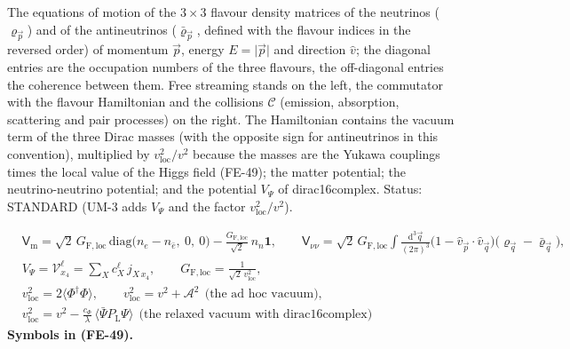 \documentclass[
  10pt,
]{article}
\begin{document}
The equations of motion of the \(3 \times 3\) flavour density matrices
of the neutrinos (\(\varrho_{\vec p}\)) and of the antineutrinos
(\(\bar\varrho_{\vec p}\), defined with the flavour indices in the
reversed order) of momentum \(\vec p\), energy
\(E = \lvert\vec p\rvert\) and direction \(\hat v\); the diagonal
entries are the occupation numbers of the three flavours, the
off-diagonal entries the coherence between them. Free streaming stands
on the left, the commutator with the flavour Hamiltonian and the
collisions \(\mathcal{C}\) (emission, absorption, scattering and pair
processes) on the right. The Hamiltonian contains the vacuum term of the
three Dirac masses (with the opposite sign for antineutrinos in this
convention), multiplied by \(v_{\mathrm{loc}}^2/v^2\) because the masses
are the Yukawa couplings times the local value of the Higgs field
(FE-49); the matter potential; the neutrino-neutrino potential; and the
potential \(V_\Psi\) of dirac16complex. Status: STANDARD (UM-3 adds
\(V_\Psi\) and the factor \(v_{\mathrm{loc}}^2/v^2\)).

\[
\begin{aligned}
&\mathsf{V}_{\mathrm{m}} = \sqrt2\,G_{\mathrm{F,loc}}\,\mathrm{diag}\big(n_e - n_{\bar e},\ 0,\ 0\big) - \frac{G_{\mathrm{F,loc}}}{\sqrt2}\,n_n\mathbf{1},\qquad
 \mathsf{V}_{\nu\nu} = \sqrt2\,G_{\mathrm{F,loc}}\int\frac{\mathrm{d}^3\vec q}{(2\pi)^3}\big(1 - \hat v_{\vec p}\cdot\hat v_{\vec q}\big)\big(\varrho_{\vec q} - \bar\varrho_{\vec q}\big),\\
&V_\Psi = \mathcal{V}^{\ell}_{x_4} = \sum_X c^{\ell}_X\,j_{X\,x_4},\qquad G_{\mathrm{F,loc}} = \frac{1}{\sqrt2\,v_{\mathrm{loc}}^2},\\
&v_{\mathrm{loc}}^2 = 2\langle\Phi^\dagger\Phi\rangle,\qquad v_{\mathrm{loc}}^2 = v^2 + \mathcal{A}^2\ \ \text{(the ad hoc vacuum)},\\
&v_{\mathrm{loc}}^2 = v^2 - \frac{c_\Phi}{\lambda}\,\langle\bar\Psi P_{\mathrm{L}}\Psi\rangle\ \ \text{(the relaxed vacuum with dirac16complex)}
\end{aligned} \tag{FE-49}
\] \textbf{Symbols in (FE-49).}
\end{document}
